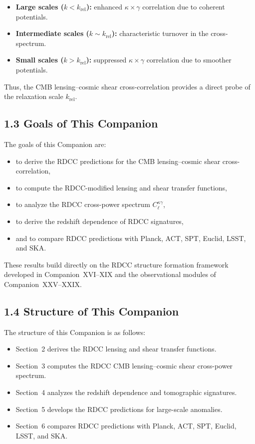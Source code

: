 \documentclass[11pt,a4paper]{article}
\begin{document}
\begin{itemize}
    \item \textbf{Large scales ($k < k_{\mathrm{rel}}$):}
    enhanced $\kappa \times \gamma$ correlation due to coherent potentials.
    \item \textbf{Intermediate scales ($k \sim k_{\mathrm{rel}}$):}
    characteristic turnover in the cross-spectrum.
    \item \textbf{Small scales ($k > k_{\mathrm{rel}}$):}
    suppressed $\kappa \times \gamma$ correlation due to smoother potentials.
\end{itemize}

Thus, the CMB lensing--cosmic shear cross-correlation provides a direct probe of the 
relaxation scale $k_{\mathrm{rel}}$.

\subsection*{1.3 Goals of This Companion}

The goals of this Companion are:

\begin{itemize}
    \item to derive the RDCC predictions for the CMB lensing--cosmic shear cross-correlation,
    \item to compute the RDCC-modified lensing and shear transfer functions,
    \item to analyze the RDCC cross-power spectrum $C_{\ell}^{\kappa \gamma}$,
    \item to derive the redshift dependence of RDCC signatures,
    \item and to compare RDCC predictions with Planck, ACT, SPT, Euclid, LSST, and SKA.
\end{itemize}

These results build directly on the RDCC structure formation framework developed in 
Companion~XVI--XIX and the observational modules of Companion~XXV--XXIX.

\subsection*{1.4 Structure of This Companion}

The structure of this Companion is as follows:

\begin{itemize}
    \item Section~2 derives the RDCC lensing and shear transfer functions.
    \item Section~3 computes the RDCC CMB lensing--cosmic shear cross-power spectrum.
    \item Section~4 analyzes the redshift dependence and tomographic signatures.
    \item Section~5 develops the RDCC predictions for large-scale anomalies.
    \item Section~6 compares RDCC predictions with Planck, ACT, SPT, Euclid, LSST, and SKA.
\end{itemize}
\end{document}
